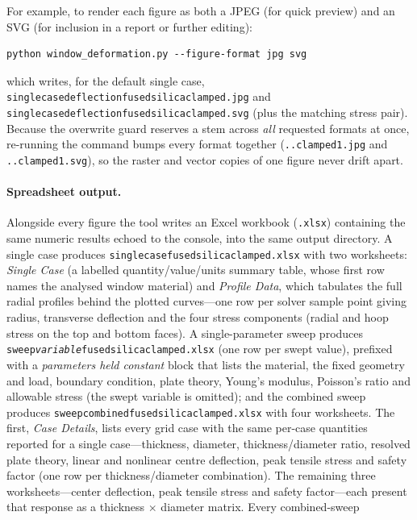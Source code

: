 \documentclass[11pt]{article}
\newcommand{\codeus}{\textunderscore\allowbreak}
\DeclareRobustCommand{\code}[1]{\texttt{\ifmmode\else\renewcommand{\_}{\codeus}\fi#1}}
\begin{document}
\noindent For example, to render each figure as both a JPEG (for quick preview)
and an SVG (for inclusion in a report or further editing):
\begin{lstlisting}[style=shellstyle]
python window_deformation.py --figure-format jpg svg
\end{lstlisting}
\noindent which writes, for the default single case,
\code{single\_case\_deflection\_fused\_silica\_clamped.jpg} and
\code{single\_case\_deflection\_fused\_silica\_clamped.svg} (plus the matching
stress pair).
Because the overwrite guard reserves a stem across \emph{all} requested formats
at once, re-running the command bumps every format together
(\code{..\_clamped\_1.jpg} and \code{..\_clamped\_1.svg}), so the raster and
vector copies of one figure never drift apart.

\paragraph{Spreadsheet output.} Alongside every figure the tool writes an Excel
workbook (\code{.xlsx}) containing the same numeric results echoed to the console,
into the same output directory. A single case produces
\code{single\_case\_fused\_silica\_clamped.xlsx} with two worksheets: \emph{Single Case}
(a labelled quantity/value/units summary table, whose first row names the
analysed window material) and \emph{Profile Data},
which tabulates the full radial profiles behind the plotted curves---one row
per solver sample point giving radius, transverse deflection and the four
stress components (radial and hoop stress on the top and bottom faces).
A single-parameter sweep produces
\code{sweep\_\textit{variable}\_fused\_silica\_clamped.xlsx} (one row per swept
value), prefixed with a \emph{parameters held constant} block that lists the
material, the fixed geometry and load, boundary condition, plate theory, Young's
modulus, Poisson's ratio and allowable stress (the swept variable is omitted); and the combined
sweep produces \code{sweep\_combined\_fused\_silica\_clamped.xlsx} with four worksheets. The first,
\emph{Case Details}, lists every grid case with the same per-case quantities
reported for a single case---thickness, diameter, thickness/diameter ratio,
resolved plate theory, linear and nonlinear centre deflection, peak tensile stress
and safety factor (one row per thickness/diameter combination). The remaining three
worksheets---center deflection, peak tensile stress and safety factor---each present
that response as a thickness $\times$ diameter matrix. Every combined-sweep
\end{document}
